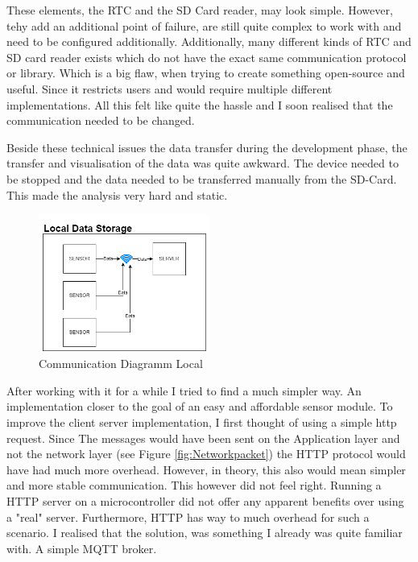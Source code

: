 These elements, the RTC and the SD Card reader, may look simple. However, tehy add an additional point of failure, are still quite complex to work with and need to be configured additionally. Additionally, many different kinds of RTC and SD card reader exists which do not have the exact same communication protocol or library. Which is a big flaw, when trying to create something open-source and useful. Since it restricts users and would require multiple different implementations. All this felt like quite the hassle and I soon realised that the communication needed to be changed.

Beside these technical issues the data transfer during the development phase, the transfer and visualisation of the data was quite awkward. The device needed to be stopped and the data needed to be transferred manually from the SD-Card. This made the analysis very hard and static.

\begin{figure}[ht]
  \begin{center}
\includegraphics[width=0.5\textwidth]{images/CommunicationDiagrammLocal.png}
  \end{center}
  \caption{Communication Diagramm Local}
  \label{fig:CommunicationDiagrammLocal}
\end{figure}

After working with it for a while I tried to find a much simpler way. An implementation closer to the goal of an easy and affordable sensor module. To improve the client server implementation, I first thought of using a simple http request. Since The messages would have been sent on the Application layer and not the network layer (see Figure \ref{fig:Networkpacket}) the HTTP protocol would have had much more overhead. However, in theory, this also would mean simpler and more stable communication. This however did not feel right. Running a HTTP server on a microcontroller did not offer any apparent benefits over using a "real" server. Furthermore, HTTP has way to much overhead for such a scenario. I realised that the solution, was something I already was quite familiar with. A simple MQTT broker. 

